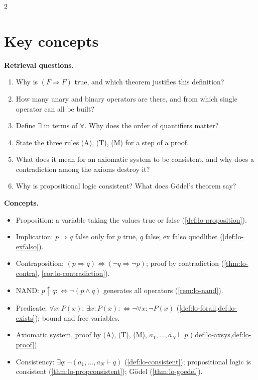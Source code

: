 \begin{paracol}{2}
\section*{Key concepts}
\begin{keyconcepts}
\textbf{Retrieval questions.}
\begin{enumerate}
  \item Why is $(F\Rightarrow F)$ true, and which theorem justifies this definition?
  \item How many unary and binary operators are there, and from which single operator can all be built?
  \item Define $\exists$ in terms of $\forall$. Why does the order of quantifiers matter?
  \item State the three rules (A), (T), (M) for a step of a proof.
  \item What does it mean for an axiomatic system to be consistent, and why does a contradiction among the axioms
        destroy it?
  \item Why is propositional logic consistent? What does G\"odel's theorem say?
\end{enumerate}
\textbf{Concepts.}
\begin{itemize}
  \item Proposition: a variable taking the values true or false (\cref{def:lo-proposition}).
  \item Implication: $p\Rightarrow q$ false only for $p$ true, $q$ false; ex falso quodlibet (\cref{def:lo-exfalso}).
  \item Contraposition: $(p\Rightarrow q)\Leftrightarrow(\neg q\Rightarrow\neg p)$; proof by contradiction
        (\cref{thm:lo-contra}, \cref{cor:lo-contradiction}).
  \item NAND: $p\uparrow q:\Leftrightarrow\neg(p\wedge q)$ generates all operators (\cref{rem:lo-nand}).
  \item Predicate; $\forall x\colon P(x)$; $\exists x\colon P(x):\Leftrightarrow\neg\forall x\colon\neg P(x)$
        (\cref{def:lo-forall,def:lo-exists}); bound and free variables.
  \item Axiomatic system, proof by (A), (T), (M), $a_1,\dots,a_N\vdash p$ (\cref{def:lo-axsys,def:lo-proof}).
  \item Consistency: $\exists q\colon\neg(a_1,\dots,a_N\vdash q)$ (\cref{def:lo-consistent}); propositional logic is
        consistent (\cref{thm:lo-propconsistent}); G\"odel (\cref{thm:lo-goedel}).
\end{itemize}
\end{keyconcepts}

\flushside
\end{paracol}
